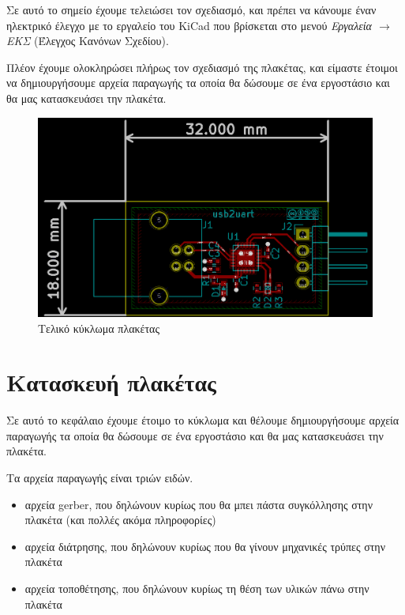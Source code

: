 \documentclass[a4paper]{article}
\begin{document}
Σε αυτό το σημείο έχουμε τελειώσει τον σχεδιασμό, και πρέπει να κάνουμε έναν ηλεκτρικό έλεγχο με το εργαλείο του \textenglish{KiCad} που βρίσκεται στο μενού \textit{Εργαλεία $\rightarrow$ ΕΚΣ} (Έλεγχος Κανόνων Σχεδίου).

Πλέον έχουμε ολοκληρώσει πλήρως τον σχεδιασμό της πλακέτας, και είμαστε έτοιμοι να δημιουργήσουμε αρχεία παραγωγής τα οποία θα δώσουμε σε ένα εργοστάσιο και θα μας κατασκευάσει την πλακέτα.

\begin{figure}
  \begin{center}
    \includegraphics[width=.9\textwidth]{img/pcb-circ-finaldrwn.png}
    \caption{Τελικό κύκλωμα πλακέτας}
    \label{fig:pcb-circ-finaldrwn}
  \end{center}
\end{figure}



\newpage
\section{Κατασκευή πλακέτας}
Σε αυτό το κεφάλαιο έχουμε έτοιμο το κύκλωμα και θέλουμε δημιουργήσουμε αρχεία παραγωγής τα οποία θα δώσουμε σε ένα εργοστάσιο και θα μας κατασκευάσει την πλακέτα. 

Τα αρχεία παραγωγής είναι τριών ειδών.

\begin{itemize}
    \item αρχεία gerber, που δηλώνουν κυρίως που θα μπει πάστα συγκόλλησης στην πλακέτα (και πολλές ακόμα πληροφορίες)
    \item αρχεία διάτρησης, που δηλώνουν κυρίως που θα γίνουν μηχανικές τρύπες στην πλακέτα
    \item αρχεία τοποθέτησης, που δηλώνουν κυρίως τη θέση των υλικών πάνω στην πλακέτα
\end{itemize}
\end{document}
